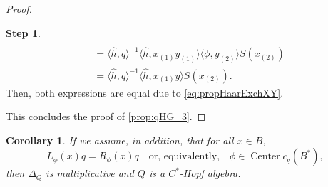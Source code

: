 \documentclass[a4paper,10pt]{amsart}
\newcommand{\eval}[2]{\langle #1 , #2\rangle}
\newtheorem{corollary}[theorem]{Corollary}
\theoremstyle{definition}
\newtheorem{step-hypergroup}{Step}
\begin{document}
\begin{proof}
\begin{step-hypergroup}
\begin{align*}
        \\ &
        = 
            \eval{\hat{h}}{q}^{-1}
            \eval{\hat{h}}{x_{(1)}y_{(1)}}
                    \eval{\phi}{y_{(2)}}
                        S(x_{(2)})
        \\ &
        =
            \eval{\hat{h}}{q}^{-1}
            \eval{\hat{h}}{x_{(1)}y}
                S(x_{(2)}).
    \end{align*}
    Then, both expressions are equal due to \cref{eq:propHaarExchXY}.
\end{step-hypergroup}
\noindent%
This concludes the proof of \cref{prop:qHG_3}.
\end{proof}

\begin{corollary} \label{prop:qHG_3_coro}
    If we assume, in addition, that for all $x\in B$,
    \begin{equation} \label{eq:prop_q_phi2}
        L_\phi(x)q=R_\phi(x)q
        \quad\text{or, equivalently,}\quad
        \phi \in \operatorname{Center} c_q(B^*),
    \end{equation}
    then $\Delta_Q$ is multiplicative and $Q$ is a $C^*$-Hopf algebra.
\end{corollary}
\end{document}
